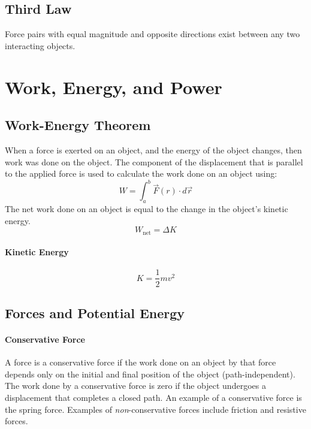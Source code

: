 \documentclass{article}
\begin{document}
        \subsection{Third Law}
            Force pairs with equal magnitude and opposite directions exist between any two interacting objects.

    \section{Work, Energy, and Power}

        \subsection{Work-Energy Theorem}
            When a force is exerted on an object, and the energy of the object changes, then work was done on the object. The component of the displacement that is parallel to the applied force is used to calculate the work done on an object using:
            \begin{equation}
                W = \int_a^b \vec{F}(r) \cdot d\vec{r}
            \end{equation}
            The net work done on an object is equal to the change in the object's kinetic energy.
            \begin{equation}
                W_\text{net} = \Delta K
            \end{equation}

            \paragraph{Kinetic Energy}
            \begin{equation}
                K = \frac{1}{2} m v^2
            \end{equation}

        \subsection{Forces and Potential Energy}
            \paragraph{Conservative Force}
            A force is a conservative force if the work done on an object by that force depends only on the initial and final position of the object (path-independent). The work done by a conservative force is zero if the object undergoes a displacement that completes a closed path. An example of a conservative force is the spring force. Examples of \textit{non}-conservative forces include friction and resistive forces.
\end{document}
